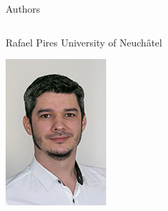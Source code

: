 \documentclass[presentation]{beamer}
\begin{document}
\begin{frame}[label={sec:org103b257}]{Authors}
\begin{block}{}
\begin{columns}
\begin{column}{0.2\columnwidth}
\begin{block}{Rafael Pires}
University of Neuchâtel\\
\begin{center}
\includegraphics[width=.9\linewidth]{./IMGs/rafael.jpg}
\end{center}
\end{block}
\end{column}


\end{columns}
\end{block}
\end{frame}
\end{document}
